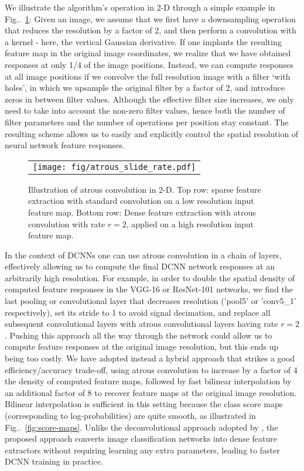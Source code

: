 \documentclass[10pt,journal,compsoc]{IEEEtran}
\makeatletter
\newcommand{\figref}[1]{Fig\onedot~\ref{#1}}
\def\onedot{\ifx\@let@token.\else.\null\fi\xspace}
\makeatother
\begin{document}
We illustrate the algorithm's operation in 2-D through a simple example in \figref{fig:hole2d}: Given an image, we 
assume that we first have a downsampling operation that reduces the resolution by a factor of 2, and then perform  a 
convolution with a  kernel - here, the vertical Gaussian derivative. If one  implants the resulting 
feature map in the original image coordinates, we realize that we have obtained responses at only 1/4 of the image positions. 
Instead, we can compute responses at all image positions 
if we convolve the full resolution image with a filter `with holes', in which 
we upsample the original filter by a
factor of 2, and introduce zeros  in between filter values. 
Although the effective filter size increases, we only need to take into account the
non-zero filter values, hence both the number of filter parameters and the number of operations per position stay constant. 
The resulting scheme allows us to easily and explicitly control the spatial resolution of neural
network feature responses.

\begin{figure}
  \centering
    \begin{tabular}{c}
\texttt{[image: fig/atrous\_slide\_rate.pdf]}
    	\vspace{-.9cm}
    \end{tabular}
   \caption{Illustration of atrous convolution in 2-D. Top row: sparse feature
   	extraction with standard convolution on a low resolution input feature map.
   	Bottom row: Dense feature extraction with atrous convolution with rate $r = 2$,
   	applied on a high resolution input feature map.}
    \label{fig:hole2d}
   \end{figure}

In the context of DCNNs one can use  atrous convolution in a chain of layers,
 effectively allowing us to compute the final DCNN network responses at an
arbitrarily high resolution. For example, in order to double the spatial density
of computed feature responses in the VGG-16 or ResNet-101 networks, we find the
last pooling or convolutional layer that decreases resolution ('pool5' or 'conv5\_1'
respectively), set its stride to 1 to avoid signal decimation, and replace all
subsequent convolutional layers with atrous convolutional layers having rate
$r = 2$. 
Pushing this approach all the
way through the network could allow us to compute feature responses at the original image
resolution, but this ends up being too
costly. We have adopted instead a hybrid approach that strikes a
good efficiency/accuracy trade-off, using atrous convolution to increase by a
factor of 4 the density of computed feature maps, followed by fast bilinear
interpolation by an additional factor of 8 to
recover feature maps at the original image resolution. Bilinear interpolation
is sufficient in this setting because the class score maps (corresponding to
log-probabilities) are quite smooth, as illustrated in
\figref{fig:score-maps}. Unlike the deconvolutional approach adopted by
\cite{long2014fully}, the proposed approach converts image classification
networks into dense feature extractors without requiring learning any extra
parameters, leading to faster DCNN training in practice. 
\end{document}
